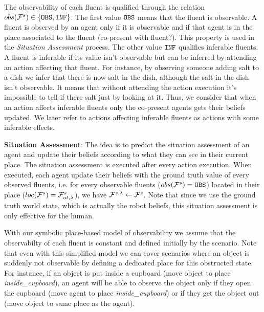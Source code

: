 \documentclass[letterpaper]{article} %
\begin{document}
The observability of each fluent is qualified through the relation $obs( \mathcal{F}^{s}_{} ) \in \{ \texttt{OBS}, \texttt{INF} \}$. 
The first value $\texttt{OBS}$ means that the fluent is observable. A fluent is observed by an agent only if it is observable and if that agent is in the place associated to the fluent (co-present with fluent?). This property is used in the \textit{Situation Assessment} process.
The other value $\texttt{INF}$ qualifies inferable fluents. A fluent is inferable if its value isn't observable but can be inferred by attending an action affecting that fluent. For instance, by observing someone adding salt to a dish we infer that there is now salt in the dish, although the salt in the dish isn't observable. It means that without attending the action execution it's impossible to tell if there salt just by looking at it. Thus, we consider that when an action affects inferable fluents only the co-present agents gets their beliefs updated. We later refer to actions affecting inferable fluents as actions with some inferable effects.

\textbf{Situation Assessment}:
The idea is to predict the situation assessment of an agent and update their beliefs according to what they can see in their current place. The situation assessment is executed after every action execution. When executed, each agent update their beliefs with the ground truth value of every observed fluents, i.e. for every observable fluents ($obs( \mathcal{F}^{s}_{} ) = \texttt{OBS}$) located in their place ($loc(\mathcal{F}^{s}_{}) = \mathcal{F}^{s}_{at,\lambda}$), we have $\mathcal{F}^{s,\lambda}_{} \gets \mathcal{F}^{s}_{}$. Note that since we use the ground truth world state, which is actually the robot beliefs, this situation assessment is only effective for the human. 

With our symbolic place-based model of observability we assume that the observabilty of each fluent is constant and defined initially by the scenario. Note that even with this simplified model we can cover scenarios where an object is suddenly not observable by defining a dedicated place for this obstructed state. For instance, if an object is put inside a cupboard (move object to place \textit{inside\_cupboard}), an agent will be able to observe the object only if they open the cupboard (move agent to place \textit{inside\_cupboard}) or if they get the object out (move object to same place as the agent).
\end{document}
